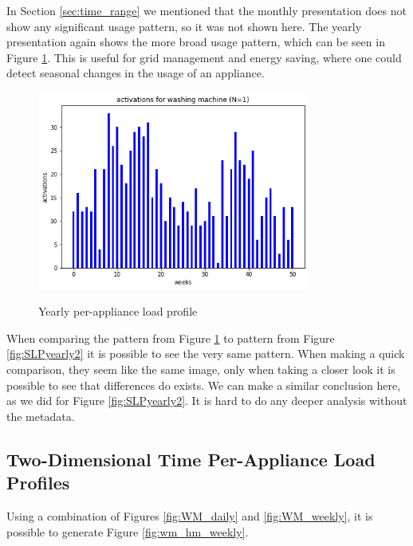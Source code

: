 In Section \ref{sec:time_range} we mentioned that the monthly presentation does not show any significant usage pattern, so it was not shown here. 
The yearly presentation again shows the more broad usage pattern, which can be seen in Figure \ref{fig:WM_yearly}.
This is useful for grid management and energy saving, where one could detect seasonal changes in the usage of an appliance. 

\begin{figure}[H]
	\centering
	\caption{Yearly per-appliance load profile}
	\includegraphics[width=0.8\textwidth]{../Figures/LPS/WM_yearly.png}
	\label{fig:WM_yearly}
\end{figure}

When comparing the pattern from Figure \ref{fig:WM_yearly} to pattern from Figure \ref{fig:SLPyearly2} 
it is possible to see the very same pattern. When making a quick comparison, they seem like the same image,
only when taking a closer look it is possible to see that differences do exists. 
We can make a similar conclusion here, as we did for Figure \ref{fig:SLPyearly2}.
It is hard to do any deeper analysis without the metadata.

\subsection{Two-Dimensional Time Per-Appliance Load Profiles}

Using a combination of Figures \ref{fig:WM_daily} and \ref{fig:WM_weekly},
it is possible to generate Figure \ref{fig:wm_hm_weekly}.

